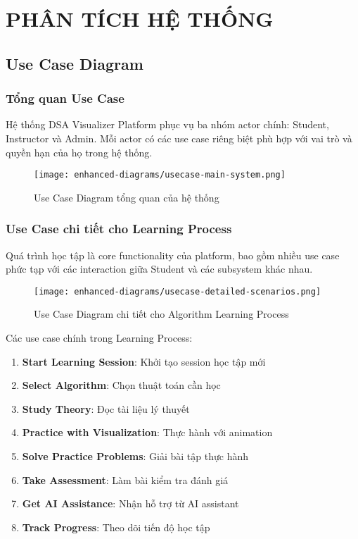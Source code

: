 \chapter{PHÂN TÍCH HỆ THỐNG}
\label{ch:system-analysis}

\section{Use Case Diagram}
\label{sec:use-case-diagram}

\subsection{Tổng quan Use Case}
\label{subsec:use-case-overview}

Hệ thống DSA Visualizer Platform phục vụ ba nhóm actor chính: Student, Instructor và Admin. Mỗi actor có các use case riêng biệt phù hợp với vai trò và quyền hạn của họ trong hệ thống.

\begin{figure}[H]
\centering
\texttt{[image: enhanced-diagrams/usecase-main-system.png]}
\caption{Use Case Diagram tổng quan của hệ thống}
\label{fig:main-usecase}
\end{figure}

\subsection{Use Case chi tiết cho Learning Process}
\label{subsec:learning-process-usecase}

Quá trình học tập là core functionality của platform, bao gồm nhiều use case phức tạp với các interaction giữa Student và các subsystem khác nhau.

\begin{figure}[H]
\centering
\texttt{[image: enhanced-diagrams/usecase-detailed-scenarios.png]}
\caption{Use Case Diagram chi tiết cho Algorithm Learning Process}
\label{fig:learning-usecase}
\end{figure}

Các use case chính trong Learning Process:

\begin{enumerate}
    \item \textbf{Start Learning Session}: Khởi tạo session học tập mới
    \item \textbf{Select Algorithm}: Chọn thuật toán cần học
    \item \textbf{Study Theory}: Đọc tài liệu lý thuyết
    \item \textbf{Practice with Visualization}: Thực hành với animation
    \item \textbf{Solve Practice Problems}: Giải bài tập thực hành
    \item \textbf{Take Assessment}: Làm bài kiểm tra đánh giá
    \item \textbf{Get AI Assistance}: Nhận hỗ trợ từ AI assistant
    \item \textbf{Track Progress}: Theo dõi tiến độ học tập
\end{enumerate}

